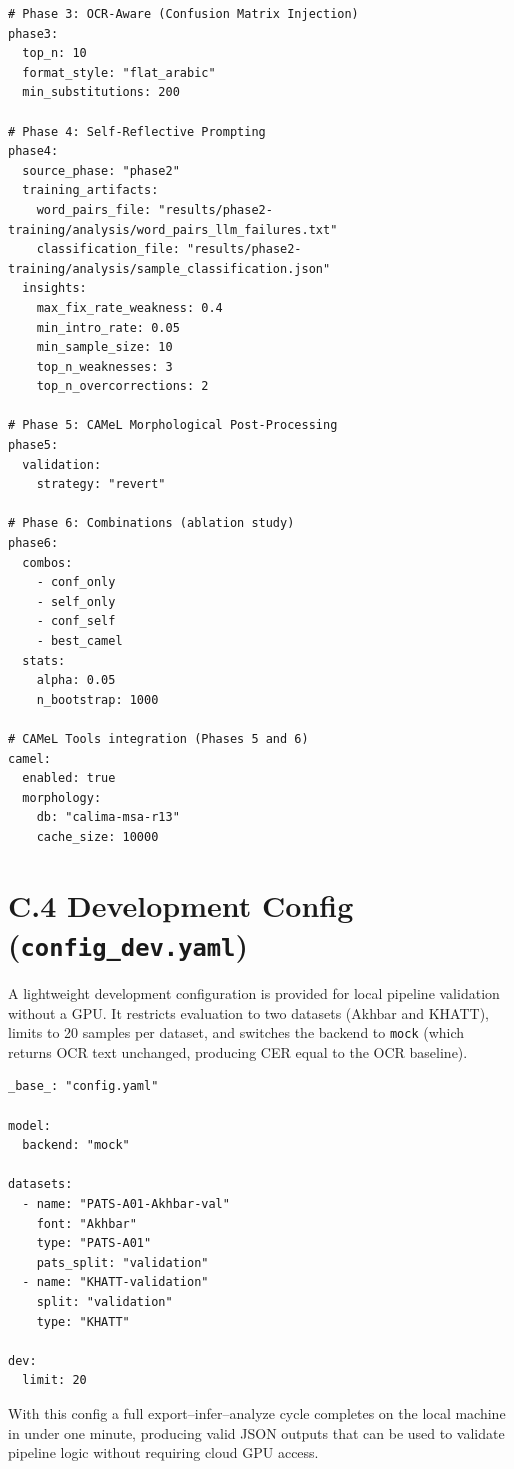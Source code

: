 \begin{lstlisting}
# Phase 3: OCR-Aware (Confusion Matrix Injection)
phase3:
  top_n: 10
  format_style: "flat_arabic"
  min_substitutions: 200

# Phase 4: Self-Reflective Prompting
phase4:
  source_phase: "phase2"
  training_artifacts:
    word_pairs_file: "results/phase2-training/analysis/word_pairs_llm_failures.txt"
    classification_file: "results/phase2-training/analysis/sample_classification.json"
  insights:
    max_fix_rate_weakness: 0.4
    min_intro_rate: 0.05
    min_sample_size: 10
    top_n_weaknesses: 3
    top_n_overcorrections: 2

# Phase 5: CAMeL Morphological Post-Processing
phase5:
  validation:
    strategy: "revert"

# Phase 6: Combinations (ablation study)
phase6:
  combos:
    - conf_only
    - self_only
    - conf_self
    - best_camel
  stats:
    alpha: 0.05
    n_bootstrap: 1000

# CAMeL Tools integration (Phases 5 and 6)
camel:
  enabled: true
  morphology:
    db: "calima-msa-r13"
    cache_size: 10000
\end{lstlisting}

\section*{C.4 \quad Development Config (\texttt{config\_dev.yaml})}

A lightweight development configuration is provided for local pipeline
validation without a GPU. It restricts evaluation to two datasets (Akhbar and
KHATT), limits to 20 samples per dataset, and switches the backend to
\texttt{mock} (which returns OCR text unchanged, producing CER equal to the
OCR baseline).

\begin{lstlisting}
_base_: "config.yaml"

model:
  backend: "mock"

datasets:
  - name: "PATS-A01-Akhbar-val"
    font: "Akhbar"
    type: "PATS-A01"
    pats_split: "validation"
  - name: "KHATT-validation"
    split: "validation"
    type: "KHATT"

dev:
  limit: 20
\end{lstlisting}

\noindent
With this config a full export--infer--analyze cycle completes on the local
machine in under one minute, producing valid JSON outputs that can be used to
validate pipeline logic without requiring cloud GPU access.
